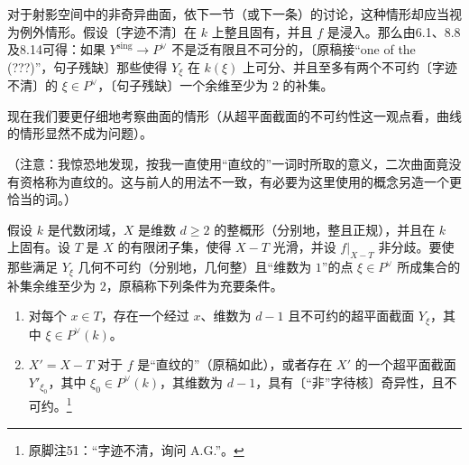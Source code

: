 对于射影空间中的非奇异曲面，依下一节（或下一条）的讨论，这种情形却应当视为例外情形。假设〔字迹不清〕在 $k$ 上整且固有，并且 $f$ 是浸入。那么由6.1、8.8及8.14可得：如果 $Y^{\mathrm{sing}}\to P^\vee$ 不是泛有限且不可分的，〔原稿接“one of the (???)”，句子残缺〕那些使得 $Y_\xi$ 在 $k(\xi)$ 上可分、并且至多有两个不可约〔字迹不清〕的 $\xi\in P^\vee$，〔句子残缺〕一个余维至少为 $2$ 的补集。

现在我们要更仔细地考察曲面的情形（从超平面截面的不可约性这一观点看，曲线的情形显然不成为问题）。

（注意：我惊恐地发现，按我一直使用“直纹的”一词时所取的意义，二次曲面竟没有资格称为直纹的。这与前人的用法不一致，有必要为这里使用的概念另造一个更恰当的词。）

假设 $k$ 是代数闭域，$X$ 是维数 $d\ge2$ 的整概形（分别地，整且正规），并且在 $k$ 上固有。设 $T$ 是 $X$ 的有限闭子集，使得 $X-T$ 光滑，并设 $f|_{X-T}$ 非分歧。要使那些满足 $Y_\xi$ 几何不可约（分别地，几何整）且“维数为 $1$”的点 $\xi\in P^\vee$ 所成集合的补集余维至少为 $2$，原稿称下列条件为充要条件。
\begin{enumerate}
\item[(a)] 对每个 $x\in T$，存在一个经过 $x$、维数为 $d-1$ 且不可约的超平面截面 $Y_\xi$，其中 $\xi\in P^\vee(k)$。
\item[(b)] $X'=X-T$ 对于 $f$ 是“直纹的”（原稿如此），或者存在 $X'$ 的一个超平面截面 $Y'_{\xi_0}$，其中 $\xi_0\in P^\vee(k)$，其维数为 $d-1$，具有〔“非”字待核〕奇异性，且不可约。\footnote{原脚注51：“字迹不清，询问 A.G.”。}
\end{enumerate}
